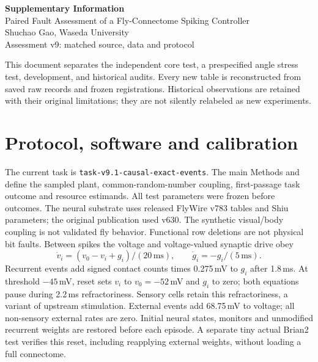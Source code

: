 \documentclass[10pt,letterpaper]{article}
\begin{document}
\begin{center}{\Large\bfseries Supplementary Information}\\[5pt]

Paired Fault Assessment of a Fly-Connectome Spiking Controller
\\[5pt]Shuchao Gao, Waseda University\\
Assessment v9: matched source, data and protocol\end{center}
This document separates the independent core test, a prespecified angle stress
test, development, and historical audits. Every new table is reconstructed from
saved raw records and frozen registrations. Historical observations are retained
with their original limitations; they are not silently relabeled as new experiments.
\section{Protocol, software and calibration}
The current task is \texttt{task-v9.1-causal-exact-events}. The main Methods and
 define the sampled plant, common-random-number coupling,
first-passage task outcome and resource estimands. All test parameters were frozen
before outcomes. The neural substrate uses released FlyWire v783 tables and Shiu
parameters; the original publication used v630. The synthetic visual/body coupling
is not validated fly behavior. Functional row deletions are not physical bit faults.
Between spikes the voltage and voltage-valued synaptic drive obey
\[
\dot v_i=(v_0-v_i+g_i)/(20\,\mathrm{ms}),\qquad
\dot g_i=-g_i/(5\,\mathrm{ms}).
\]
Recurrent events add signed contact counts times 0.275\,mV to $g_i$ after
1.8\,ms. At threshold $-45$\,mV, reset sets $v_i$ to $v_0=-52$\,mV and
$g_i$ to zero; both equations pause during 2.2\,ms refractoriness. Sensory
cells retain this refractoriness, a variant of upstream stimulation. External
events add 68.75\,mV to voltage; all non-sensory external rates are zero.
Initial neural states, monitors and unmodified recurrent weights are restored
before each episode. A separate tiny actual Brian2 test verifies this reset,
including reapplying external weights, without loading a full connectome.
\end{document}
